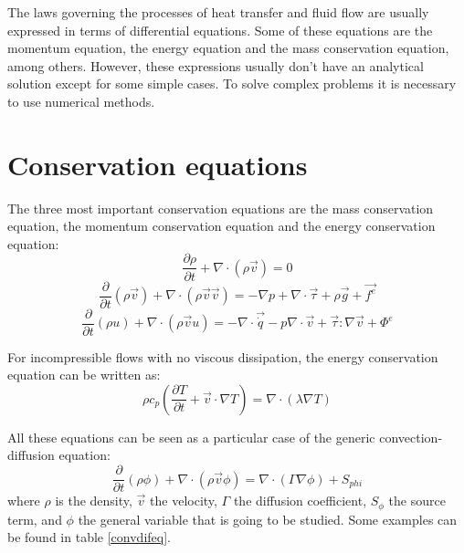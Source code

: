 The laws governing the processes of heat transfer and fluid flow are usually expressed in terms of differential equations. Some of these equations are the momentum equation, the energy equation and the mass conservation equation, among others. However, these expressions usually don’t have an analytical solution except for some simple cases. To solve complex problems it is necessary to use numerical methods.

\section{Conservation equations}
The three most important conservation equations are the mass conservation equation, the momentum conservation equation and the energy conservation equation:
\begin{equation}
\frac{\partial\rho}{\partial t}+\nabla\cdot\left(\rho\vec{v}\right)=0
\end{equation}
\begin{equation}
\frac{\partial}{\partial t}\left(\rho\vec{v}\right)+\nabla\cdot\left(\rho\vec{v}\vec{v}\right)=-\nabla p+\nabla\cdot\vec{\tau}+\rho\vec{g}+\vec{f^{e}}
\end{equation}
\begin{equation}
\frac{\partial}{\partial t}(\rho u)+\nabla\cdot\left(\rho\vec{v}u\right)=-\nabla\cdot\vec{\dot{q}}-p\nabla\cdot\vec{v}+\vec{\tau}:\nabla\vec{v}+\Phi^{e}
\end{equation}

For incompressible flows with no viscous dissipation, the energy conservation equation can be written as:
\begin{equation}
\rho c_{p}\left(\frac{\partial T}{\partial t}+\vec{v}\cdot\nabla T\right)=\nabla\cdot\left(\lambda\nabla T\right)
\end{equation}

All these equations can be seen as a particular case of the generic convection-diffusion equation:
\begin{equation}
\frac{\partial}{\partial t}\left(\rho\phi\right)+\nabla\cdot\left(\rho\vec{v}\phi\right)=\nabla\cdot\left(\Gamma\nabla\phi\right)+S_{phi}
\end{equation}
where $\rho$ is the density, $\vec{v}$ the velocity, $\Gamma$ the diffusion coefficient, $S_{\phi}$ the source term, and $\phi$ the general variable that is going to be studied. Some examples can be found in table \ref{convdifeq}.

